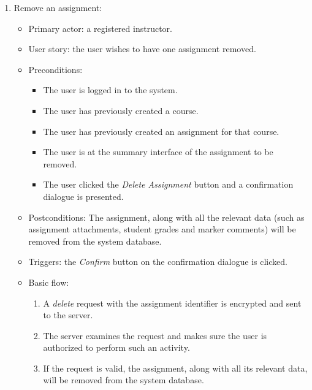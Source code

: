 \begin{enumerate}
\item Remove an assignment:
\begin{itemize}
    \item Primary actor: a registered instructor.
    \item User story: the user wishes to have one assignment removed.
    \item Preconditions:
        \begin{itemize}
            \item The user is logged in to the system.
            \item The user has previously created a course.
            \item The user has previously created an assignment for that course.
            \item The user is at the summary interface of the assignment to be
                removed.
            \item The user clicked the \emph{Delete Assignment} button and a
                confirmation dialogue is presented.
        \end{itemize}
    \item Postconditions:
        The assignment, along with all the relevant data (such as assignment
        attachments, student grades and marker comments) will be removed from
        the system database.
    \item Triggers: the \emph{Confirm} button on the confirmation dialogue is
        clicked.
    \item Basic flow:
        \begin{enumerate}
            \item A \emph{delete} request with the assignment identifier is encrypted
                and sent to the server.
            \item The server examines the request and makes sure the user is
                authorized to perform such an activity.
            \item If the request is valid, the assignment, along with all its
                relevant data, will be removed from the system database.
        \end{enumerate}
\end{itemize}


\end{enumerate}
